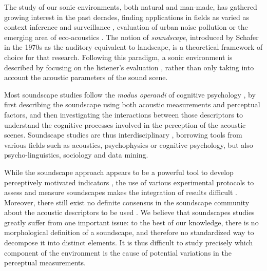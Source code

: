 \documentclass[twoside,twocolumn]{article}
\begin{document}




The study of our sonic environments, both natural and man-made, has gathered growing interest in the past decades, finding applications in fields as varied as context inference and surveillance \cite{heittola13,1540194,park14}, evaluation of urban noise pollution \cite{raimbault_urban_2005} or the emerging area of eco-acoustics \cite{ECOACOUSTICS2014, krause}. The notion of \emph{soundscape}, introduced by Schafer \cite{schafer_new_1969, schafer1977tuning} in the 1970s as the auditory equivalent to landscape, is a theoretical framework of choice for that research. Following this paradigm, a sonic environment is described by focusing on the listener's evaluation , rather than only taking into account the acoustic parameters of the sound scene. 

Most soundscape studies follow the \emph{modus operandi} of cognitive psychology \cite{maffiolo_caracterisation_1999}, by first describing the soundscape using both acoustic measurements and perceptual factors, and then investigating the interactions between those descriptors to understand the cognitive processes involved in the perception of the acoustic scenes. Soundscape studies are thus interdisciplinary \cite{davies_perception_2013, aletta2016soundscape}, borrowing tools from various fields such as acoustics, psychophysics or cognitive psychology, but also psycho-linguistics, sociology and data mining. 

While the soundscape approach appears to be a powerful tool to develop perceptively motivated indicators \cite{schulte-fortkamp_soundscape:_2007}, the use of various experimental protocols to assess and measure soundscapes makes the integration of results difficult \cite{davies_perception_2013}. Moreover, there still exist no definite consensus in the soundscape community about the acoustic descriptors to be used \cite{brocolini2012prediction,aletta2016soundscape}. We believe that soundscapes studies greatly suffer from one important issue: to the best of our knowledge, there is no morphological definition of a soundscape, and therefore no standardized way to decompose it into distinct elements. It is thus difficult to study precisely which component of the environment is the cause of potential variations in the perceptual measurements.
\end{document}
